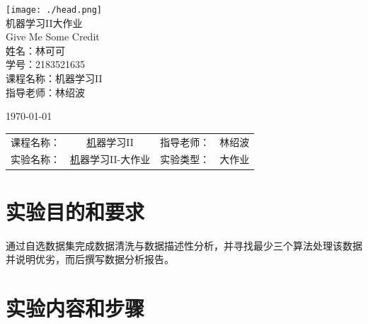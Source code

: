 \documentclass{zjureport}
\newcommand{\course}{机器学习II}
\newcommand{\newtitle}{机器学习II-大作业}
\begin{document}
\thispagestyle{empty}

\begin{titlepage}

\begin{center}

\texttt{[image: ./head.png]}\\[1.0cm]    

{\huge 机器学习II大作业}\\[1.0cm]



{ \huge Give Me Some Credit}\\[6.5cm]


\textsc{\Large 姓名：林可可}\\[0.35cm]

\textsc{\Large 学号：2183521635}\\[0.35cm]

\textsc{\Large 课程名称：机器学习II}\\[0.35cm]

\textsc{\Large 指导老师：林绍波}


\vfill

{\large \today}

\end{center}

\end{titlepage}

\renewcommand{\contentsname}{目录}
\tableofcontents

\clearpage


\begin{center}
 \begin{tabular}{cccc}
    课程名称： & \underline\course   & 指导老师： & 林绍波\\
    实验名称： & \underline\newtitle & 实验类型： & 大作业
\end{tabular}
\end{center}





\section{实验目的和要求}
  通过自选数据集完成数据清洗与数据描述性分析，并寻找最少三个算法处理该数据并说明优劣，而后撰写数据分析报告。
\section{实验内容和步骤}
\end{document}
